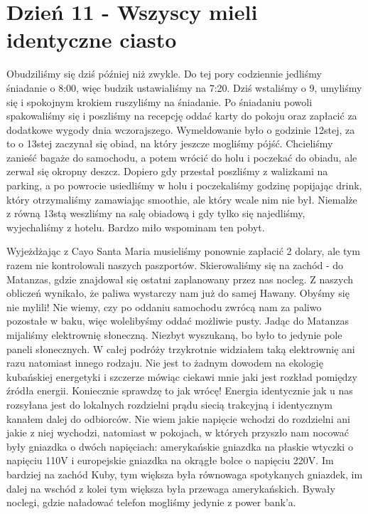 
\chapter[Wszyscy mieli identyczne ciasto]{Dzień 11 - Wszyscy mieli identyczne ciasto}

Obudziliśmy się dziś później niż zwykle.
Do tej pory codziennie jedliśmy śniadanie o 8:00, więc budzik ustawialiśmy na 7:20.
Dziś wstaliśmy o 9, umyliśmy się i spokojnym krokiem ruszyliśmy na śniadanie.
Po śniadaniu powoli spakowaliśmy się i poszliśmy na recepcję oddać karty do pokoju oraz zapłacić za dodatkowe wygody dnia wczorajszego.
Wymeldowanie było o godzinie 12stej, za to o 13stej zaczynał się obiad, na który jeszcze mogliśmy pójść.
Chcieliśmy zanieść bagaże do samochodu, a potem wrócić do holu i poczekać do obiadu, ale zerwał się okropny deszcz.
Dopiero gdy przestał poszliśmy z walizkami na parking, a po powrocie usiedliśmy w holu i poczekaliśmy godzinę popijając drink, który otrzymaliśmy zamawiając smoothie, ale który wcale nim nie był.
Niemalże z równą 13stą weszliśmy na salę obiadową i gdy tylko się najedliśmy, wyjechaliśmy z hotelu.
Bardzo miło wspominam ten pobyt.
\par Wyjeżdżając z Cayo Santa Maria musieliśmy ponownie zapłacić 2 dolary, ale tym razem nie kontrolowali naszych paszportów.
Skierowaliśmy się na zachód - do Matanzas, gdzie znajdował się ostatni zaplanowany przez nas nocleg.
Z naszych obliczeń wynikało, że paliwa wystarczy nam już do samej Hawany.
Obyśmy się nie mylili!
Nie wiemy, czy po oddaniu samochodu zwrócą nam za paliwo pozostałe w baku, więc wolelibyśmy oddać możliwie pusty.
Jadąc do Matanzas mijaliśmy elektrownię słoneczną.
Niezbyt wyszukaną, bo było to jedynie pole paneli słonecznych.
W całej podróży trzykrotnie widziałem taką elektrownię ani razu natomiast innego rodzaju.
Nie jest to żadnym dowodem na ekologię kubańskiej energetyki i szczerze mówiąc ciekawi mnie jaki jest rozkład pomiędzy źródła energii.
Koniecznie sprawdzę to jak wrócę!
Energia identycznie jak u nas rozsyłana jest do lokalnych rozdzielni prądu siecią trakcyjną i identycznym kanałem dalej do odbiorców.
Nie wiem jakie napięcie wchodzi do rozdzielni ani jakie z niej wychodzi, natomiast w pokojach, w których przyszło nam nocować były gniazdka o dwóch napięciach: amerykańskie gniazdka na płaskie wtyczki o napięciu 110V i europejskie gniazdka na okrągłe bolce o napięciu 220V.
Im bardziej na zachód Kuby, tym większa była równowaga spotykanych gniazdek, im dalej na wschód z kolei tym większa była przewaga amerykańskich.
Bywały noclegi, gdzie naładować telefon mogliśmy jedynie z power bank’a.
